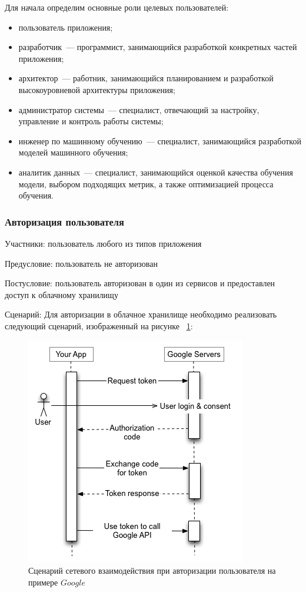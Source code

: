 Для начала определим основные роли целевых пользователей:
\begin{itemize}
    \item пользователь приложения;
    \item разработчик~--- программист, занимающийся разработкой конкретных частей приложения;
    \item архитектор~--- работник, занимающийся планированием и разработкой высокоуровневой архитектуры приложения;
    \item администратор системы~--- специалист, отвечающий за настройку, управление и контроль работы системы;
    \item инженер по машинному обучению~--- специалист, занимающийся разработкой моделей машинного обучения;
    \item аналитик данных~--- специалист, занимающийся оценкой качества обучения модели, выбором подходящих метрик, а также оптимизацией процесса обучения.
\end{itemize}

\subsubsection{Авторизация пользователя}
Участники: пользователь любого из типов приложения

Предусловие: пользователь не авторизован

Постусловие: пользователь авторизован в один из сервисов и предоставлен доступ к облачному хранилищу

Сценарий:
Для авторизации в облачное хранилище необходимо реализовать следующий сценарий, изображенный на рисунке ~\ref{auth}:

\begin{figure}
    \includegraphics[scale=0.5]{img/use_cases/authorization.png}
    \caption{Сценарий сетевого взаимодействия при авторизации пользователя \cite{OAuth_google} на примере $Google$}
    \label{auth}
\end{figure}

